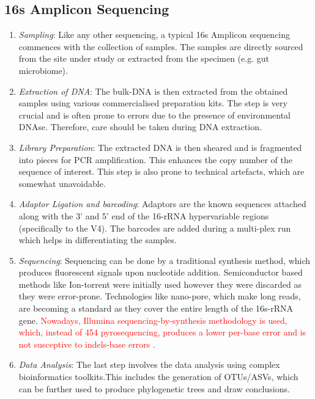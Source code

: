 \subsection{16s Amplicon Sequencing}

\begin{enumerate}
  \item \textit{Sampling}: Like any other sequencing, a typical 16s Amplicon sequencing commences with the collection of samples. The samples are directly sourced from the site under study or extracted from the specimen (e.g. gut microbiome).
  \item \textit{Extraction of DNA}: The bulk-DNA is then extracted from the obtained samples using various commercialised preparation kits. The step is very crucial and is often prone to errors due to the presence of environmental DNAse. Therefore, care should be taken during DNA extraction.
  \item \textit{Library Preparation}: The extracted DNA is then sheared and is fragmented into pieces for PCR amplification. This enhances the copy number of the sequence of interest. This step is also prone to technical artefacts, which are somewhat unavoidable. 
  \item \textit{Adaptor Ligation and barcoding}: Adaptors are the known sequences attached along with the 3' and 5' end of the 16-rRNA hypervariable regions (specifically to the V4). The barcodes are added during a multi-plex run which helps in differentiating the samples.
  \item \textit{Sequencing}: Sequencing can be done by a traditional synthesis method, which produces fluorescent signals upon nucleotide addition. Semiconductor based methods like Ion-torrent were initially used however they were discarded as they were error-prone. Technologies like nano-pore, which make long reads, are becoming a standard as they cover the entire length of the 16s-rRNA gene. \textcolor{red}{Nowadays, Illumina sequencing-by-synthesis methodology is used, which, instead of 454 pyrosequencing, produces a lower per-base error and is not susceptive to indels-base errors \cite{ref14}.}
  \item \textit{Data Analysis}: The last step involves the data analysis using complex bioinformatics toolkits.This includes the generation of OTUs/ASVs, which can be further used to produce phylogenetic trees and draw conclusions.
\end{enumerate}

